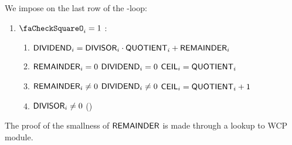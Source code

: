 We impose on the last row of the \ct{}-loop:
\begin{enumerate}
	\item \If $\done_{i}=1$ \Then:
	\begin{enumerate}
		\item \label{euc: result: euclidean division equation} $\textsf{DIVIDEND}_{i} = \textsf{DIVISOR}_{i} \cdot \textsf{QUOTIENT}_{i} + \textsf{REMAINDER}_{i}$
		\item \If $\textsf{REMAINDER}_{i}=0$      \Or $\textsf{DIVIDEND}_{i}=0$      \Then $\textsf{CEIL}_{i} = \textsf{QUOTIENT}_{i}$
		\item \If $\textsf{REMAINDER}_{i} \neq 0$ \et $\textsf{DIVIDEND}_{i} \neq 0$ \Then $\textsf{CEIL}_{i} = \textsf{QUOTIENT}_{i}+1$
		\item $\textsf{DIVISOR}_{i} \neq 0$  \quad (\trash)
	\end{enumerate}
\end{enumerate}
The proof of the smallness of $\textsf{REMAINDER}$ is made through a lookup to WCP module.
